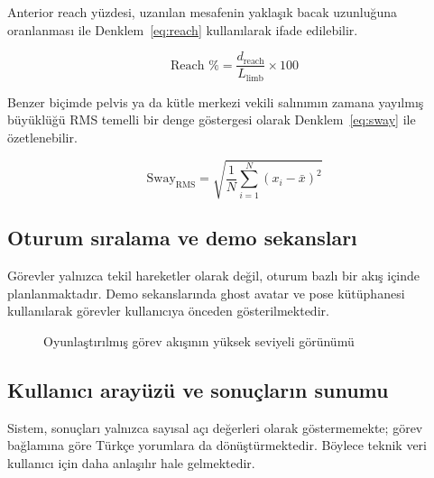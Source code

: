 \documentclass[12pt,a4paper,oneside]{report}
\begin{document}
Anterior reach yüzdesi, uzanılan mesafenin yaklaşık bacak uzunluğuna oranlanması ile Denklem~\ref{eq:reach} kullanılarak ifade edilebilir.

\begin{equation}
\text{Reach \%} = \frac{d_{\text{reach}}}{L_{\text{limb}}} \times 100
\label{eq:reach}
\end{equation}

Benzer biçimde pelvis ya da kütle merkezi vekili salınımın zamana yayılmış büyüklüğü RMS temelli bir denge göstergesi olarak Denklem~\ref{eq:sway} ile özetlenebilir.

\begin{equation}
\text{Sway}_{\text{RMS}} = \sqrt{\frac{1}{N} \sum_{i=1}^{N} \left(x_i - \bar{x}\right)^2}
\label{eq:sway}
\end{equation}

\subsection{Oturum sıralama ve demo sekansları}
Görevler yalnızca tekil hareketler olarak değil, oturum bazlı bir akış içinde planlanmaktadır. Demo sekanslarında ghost avatar ve pose kütüphanesi kullanılarak görevler kullanıcıya önceden gösterilmektedir.

\begin{figure}[H]
\centering
{}
\caption{Oyunlaştırılmış görev akışının yüksek seviyeli görünümü}
\label{fig:sessionflow}
\end{figure}

\subsection{Kullanıcı arayüzü ve sonuçların sunumu}
Sistem, sonuçları yalnızca sayısal açı değerleri olarak göstermemekte; görev bağlamına göre Türkçe yorumlara da dönüştürmektedir. Böylece teknik veri kullanıcı için daha anlaşılır hale gelmektedir.
\end{document}
